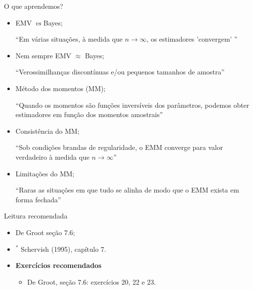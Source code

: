 \begin{frame}{O que aprendemos?}
\begin{itemize}
  \item[\faLightbulbO] EMV~\textit{vs} Bayes;
 
   ``Em várias situações, à medida que $n \to \infty$, os estimadores 'convergem' ''
  
  \item[\faLightbulbO] Nem sempre EMV $\approx$ Bayes;
 
   ``Verossimilhanças discontínuas e/ou pequenos tamanhos de amostra''
   
  \item[\faLightbulbO] Método dos momentos (MM);
  
  ``Quando os momentos são funções inversíveis dos parâmetros, podemos obter estimadores em função dos momentos amostrais''
  
    \item[\faLightbulbO] Consistência do MM;
  
  ``Sob condições brandas de regularidade, o EMM converge para valor verdadeiro à medida que $n \to \infty$''
  
    \item[\faLightbulbO] Limitações do MM;
  
  ``Raras as situações em que tudo se alinha de modo que o EMM exista em forma fechada''
  
  \end{itemize}
 \end{frame}

\begin{frame}{Leitura recomendada}
\begin{itemize}
 \item[\faBook] De Groot seção 7.6;
 \item[\faBook] $^\ast$ Schervish (1995), capítulo 7.
 \item {\large\textbf{Exercícios recomendados}}
 \begin{itemize}
  \item[\faBookmark] De Groot, seção 7.6: exercícios 20, 22 e 23. 
  \end{itemize}
 \end{itemize} 
\end{frame}
